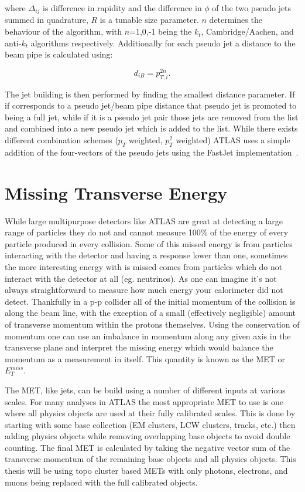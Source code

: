 where $\Delta_{ij}$ is difference in rapidity and the difference in $\phi$ of the two pseudo jets summed in quadrature, $R$ is a tunable size parameter.  
$n$ determines the behaviour of the algorithm, with $n$=1,0,-1 being the $k_t$, Cambridge/Aachen, and anti-$k_t$ algorithms respectively.  
Additionally for each pseudo jet a distance to the beam pipe is calculated using:

\begin{equation}
  d_{iB} = p_{T,i}^{2n}.
\end{equation}  

The jet building is then performed by finding the smallest distance parameter.  
If if corresponds to a pseudo jet/beam pipe distance that pseudo jet is promoted to being a full jet, while if it is a pseudo jet pair those jets are removed from the list and combined into a new pseudo jet which is added to the list.  
While there exists different combination schemes ($p_T$ weighted, $p_T^2$ weighted) ATLAS uses a simple addition of the four-vectors of the pseudo jets using the FastJet implementation~\cite{Cacciari:2011ma}.

\section{Missing Transverse Energy}

While large multipurpose detectors like ATLAS are great at detecting a large range of particles they do not and cannot measure 100\% of the energy of every particle produced in every collision.  
Some of this missed energy is from particles interacting with the detector and having a response lower than one, sometimes the more interesting energy with is missed comes from particles which do not interact with the detector at all (eg. neutrinos).  
As one can imagine it's not always straightforward to measure how much energy your calorimeter did not detect.  
Thankfully in a p-p collider all of the initial momentum of the collision is along the beam line, with the exception of a small (effectively negligible) amount of transverse momentum within the protons themselves.  
Using the conservation of momentum one can use an imbalance in momentum along any given axis in the transverse plane and interpret the missing energy which would balance the momentum as a measurement in itself.  
This quantity is known as the \gls{MET} or $E_T^{miss}$.  


The MET, like jets, can be build using a number of different inputs at various scales.  
For many analyses in ATLAS the most appropriate MET to use is one where all physics objects are used at their fully calibrated scales.  
This is done by starting with some base collection (EM clusters, LCW clusters, tracks, etc.) then adding physics objects while removing overlapping base objects to avoid double counting.  
The final MET is calculated by taking the negative vector sum of the transverse momentum of the remaining base objects and all physics objects.  
This thesis will be using topo cluster based METs with only photons, electrons, and muons being replaced with the full calibrated objects.  




